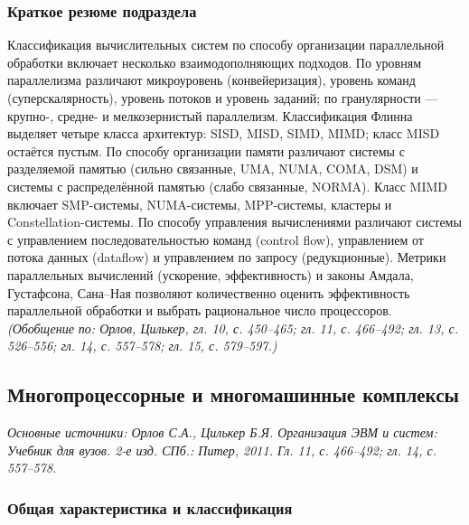 \documentclass[a4paper,12pt]{article}
\begin{document}
\subsubsection{Краткое резюме подраздела}
Классификация вычислительных систем по способу организации параллельной обработки включает несколько взаимодополняющих подходов. По уровням параллелизма различают микроуровень (конвейеризация), уровень команд (суперскалярность), уровень потоков и уровень заданий; по гранулярности — крупно-, средне- и мелкозернистый параллелизм. Классификация Флинна выделяет четыре класса архитектур: SISD, MISD, SIMD, MIMD; класс MISD остаётся пустым. По способу организации памяти различают системы с разделяемой памятью (сильно связанные, UMA, NUMA, COMA, DSM) и системы с распределённой памятью (слабо связанные, NORMA). Класс MIMD включает SMP-системы, NUMA-системы, MPP-системы, кластеры и Constellation-системы. По способу управления вычислениями различают системы с управлением последовательностью команд (control flow), управлением от потока данных (dataflow) и управлением по запросу (редукционные). Метрики параллельных вычислений (ускорение, эффективность) и законы Амдала, Густафсона, Сана–Ная позволяют количественно оценить эффективность параллельной обработки и выбрать рациональное число процессоров.
\textit{(Обобщение по: Орлов, Цилькер, гл. 10, с. 450--465; гл. 11, с. 466--492; гл. 13, с. 526--556; гл. 14, с. 557--578; гл. 15, с. 579--597.)}

\subsection{Многопроцессорные и многомашинные комплексы}

\noindent\textit{Основные источники: Орлов С.А., Цилькер Б.Я. Организация ЭВМ и систем: Учебник для вузов. 2-е изд. СПб.: Питер, 2011. Гл. 11, с. 466--492; гл. 14, с. 557--578.}

\subsubsection{Общая характеристика и классификация}
\end{document}
